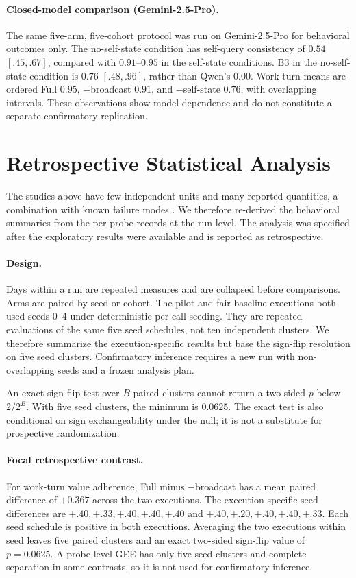 \documentclass[11pt]{article}
\begin{document}
\paragraph{Closed-model comparison (Gemini-2.5-Pro).} The same five-arm, five-cohort protocol was run on Gemini-2.5-Pro for behavioral outcomes only. The no-self-state condition has self-query consistency of $0.54$ $[.45,.67]$, compared with $0.91$--$0.95$ in the self-state conditions. B3 in the no-self-state condition is $0.76$ $[.48,.96]$, rather than Qwen's $0.00$. Work-turn means are ordered Full $0.95$, $-$broadcast $0.91$, and $-$self-state $0.76$, with overlapping intervals. These observations show model dependence and do not constitute a separate confirmatory replication.

\section{Retrospective Statistical Analysis}
\label{sec:stats}
The studies above have few independent units and many reported quantities, a combination with known failure modes \citep{card2020power,henderson2018deeprl}. We therefore re-derived the behavioral summaries from the per-probe records at the run level. The analysis was specified after the exploratory results were available and is reported as retrospective.

\paragraph{Design.} Days within a run are repeated measures and are collapsed before comparisons. Arms are paired by seed or cohort. The pilot and fair-baseline executions both used seeds 0--4 under deterministic per-call seeding. They are repeated evaluations of the same five seed schedules, not ten independent clusters. We therefore summarize the execution-specific results but base the sign-flip resolution on five seed clusters. Confirmatory inference requires a new run with non-overlapping seeds and a frozen analysis plan.

An exact sign-flip test over $B$ paired clusters cannot return a two-sided $p$ below $2/2^B$. With five seed clusters, the minimum is $0.0625$. The exact test is also conditional on sign exchangeability under the null; it is not a substitute for prospective randomization.

\paragraph{Focal retrospective contrast.} For work-turn value adherence, Full minus $-$broadcast has a mean paired difference of $+0.367$ across the two executions. The execution-specific seed differences are $+.40, +.33, +.40, +.40, +.40$ and $+.40, +.20, +.40, +.40, +.33$. Each seed schedule is positive in both executions. Averaging the two executions within seed leaves five paired clusters and an exact two-sided sign-flip value of $p=0.0625$. A probe-level GEE has only five seed clusters and complete separation in some contrasts, so it is not used for confirmatory inference.
\end{document}
